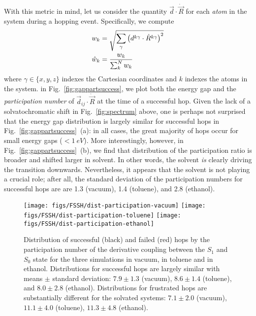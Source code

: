 \documentclass[journal=jctcce,manuscript=article,layout=traditional]{achemso}
\newcommand{\fig}[1]{Fig.~\ref{#1}}
\begin{document}
With this metric in mind, let us consider the quantity $\vec{d} \cdot \dot{\vec{R}}$ for each \emph{atom} in the system during a hopping event. Specifically, we compute
\begin{align}
    w_k &= \sqrt{\sum_{\gamma} {\qty(d^{k \gamma} \cdot \dot{R}^{k \gamma})}^{2}} \\
    \hat{w}_k &= \frac{w_k}{\sum_k^N w_k}
\end{align}
where $\gamma \in \{x,y,z\}$ indexes the Cartesian coordinates and $k$ indexes the atoms in the system.
in \fig{fig:gappartsuccess}, we plot both the energy gap and the \emph{participation number} of $\vec{d}_{ij}\cdot\dot{\vec{R}}$ at the time of a successful hop.
Given the lack of a solvatochromatic shift in \fig{fig:spectrum} above, one is perhaps not surprised that the energy gap distribution is largely similar for successful hops in \fig{fig:gappartsuccess}~(a): in all cases, the great majority of hops occur for small energy gaps ($<1~eV$). 
More interestingly, however, in \fig{fig:gappartsuccess}~(b), we find that distribution of the participation ratio is broader and shifted larger in solvent.
In other words, the solvent {\em is} clearly driving the transition downwards. Nevertheless, it appears that the solvent is not playing a crucial role; after all, the standard deviation of the participation numbers for successful hops are are 1.3 (vacuum), 1.4  (toluene), and 2.8 (ethanol).

%
%
%
%
%

%
%
%
%
%


%

%
%

\begin{figure}
    \centering
    \texttt{[image: figs/FSSH/dist-participation-vacuum]}
    \texttt{[image: figs/FSSH/dist-participation-toluene]}
    \texttt{[image: figs/FSSH/dist-participation-ethanol]}
    \caption{Distribution of successful (black) and failed (red) hops by the participation number of the derivative coupling between the $S_1$ and $S_0$ state for the three simulations in vacuum, in toluene and in ethanol. Distributions for successful hops are largely similar with means $\pm$ standard deviation:  $7.9  \pm 1.3$ (vacuum), $8.6  \pm 1.4$ (toluene), and $8.0  \pm 2.8$ (ethanol). Distributions for frustrated hops are substantially different for the solvated systems: $7.1  \pm  2.0$ (vacuum), $11.1 \pm  4.0$ (toluene), $11.3 \pm  4.8$ (ethanol).}

    \label{fig:partall}
\end{figure}
\end{document}
